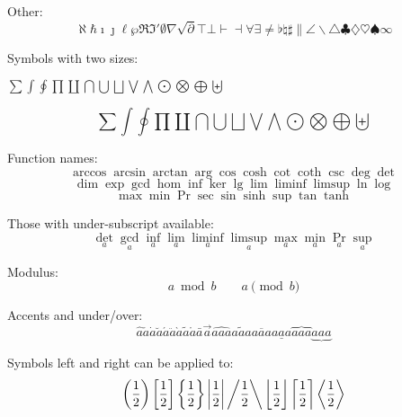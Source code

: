 \documentclass[12pt,a4paper,onecolumn]{article}
\begin{document}
Other:
\begin{equation}
\aleph \hbar \imath \jmath \ell \wp \Re \Im \prime \emptyset \nabla \surd \partial \top \bot \vdash \dashv \forall \exists \neq \flat \natural \sharp \| \angle \backslash \triangle \clubsuit \diamondsuit \heartsuit \spadesuit \infty
\end{equation}

Symbols with two sizes: 
\begin{center}
$\sum \int \oint \prod \coprod \bigcap \bigcup \bigsqcup \bigvee \bigwedge \bigodot \bigotimes \bigoplus \biguplus$
\end{center}
\begin{equation}
\sum \int \oint \prod \coprod \bigcap \bigcup \bigsqcup \bigvee \bigwedge \bigodot \bigotimes \bigoplus \biguplus
\end{equation}

Function names:
\begin{equation}
\arccos \arcsin \arctan \arg \cos \cosh \cot \coth \csc \deg \det 
\end{equation}
\begin{equation}
\dim \exp \gcd \hom \inf \ker \lg \lim \liminf \limsup \ln \log 
\end{equation}
\begin{equation}
\max \min \Pr \sec \sin \sinh \sup \tan \tanh
\end{equation}

Those with under-subscript available:
\begin{equation}
\det_{a} \gcd_{a} \inf_{a} \lim_{a} \liminf_{a} \limsup_{a} \max_{a} \min_{a} \Pr_{a} \sup_{a}
\end{equation}

Modulus:
\begin{equation}
a \bmod b \qquad a \pmod{b}
\end{equation}

Accents and under/over:
\begin{equation}
\hat{a} \check{a} \dot{a} \breve{a} \acute{a} \ddot{a} \grave{a} \tilde{a} \mathring{a} \bar{a} \vec{a} \widehat{aaa} \widetilde{aaa} \overline{aaa} \underline{aaa} \overbrace{aaa} \underbrace{aaa}
\end{equation}

Symbols left and right can be applied to:
\begin{equation}
\left( \frac{1}{2} \right) \left[ \frac{1}{2} \right] \left\{ \frac{1}{2} \right\} \left| \frac{1}{2} \right| \left/ \frac{1}{2} \right\backslash \left\lfloor \frac{1}{2} \right\rfloor \left\lceil \frac{1}{2} \right\rceil \left\langle \frac{1}{2} \right\rangle 
\end{equation}
\end{document}
